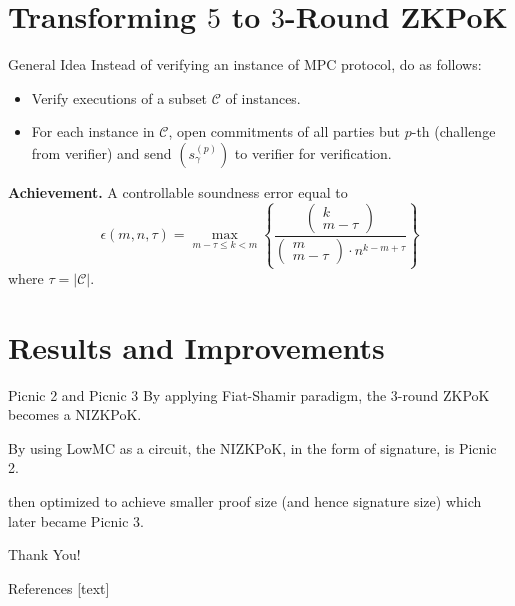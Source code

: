 \documentclass{beamer}
\begin{document}
	\section{Transforming $5$ to $3$-Round ZKPoK}
	\begin{frame}{General Idea}
		Instead of verifying an instance of MPC protocol, do as follows:\pause
		\begin{itemize}
			\item Verify executions of a subset $\mathcal{C}$ of instances.\pause
			\item For each instance in $\mathcal{C}$, open commitments of all parties but $p$-th (challenge from verifier) and send $(s_\gamma^{(p)})$ to verifier for verification.\pause
		\end{itemize}
		
		\textbf{Achievement.} A controllable soundness error equal to 
		\begin{equation*}
			\epsilon(m, n, \tau) = \max_{m - \tau \leq k < m}\left\{\frac{\begin{pmatrix}
					k\\m-\tau
			\end{pmatrix}}{\begin{pmatrix}
			m\\m-\tau
		\end{pmatrix}\cdot n^{k - m + \tau}}\right\}
		\end{equation*}
		where $\tau = \vert \mathcal{C}\vert$.
	\end{frame}

	\section{Results and Improvements}
	\begin{frame}{Picnic 2 and Picnic 3}
		By applying Fiat-Shamir paradigm, the $3$-round ZKPoK becomes a NIZKPoK.\pause
		
		By using LowMC as a circuit, the NIZKPoK, in the form of signature, is Picnic 2.\pause
		
		\cite{KalesZ20} then optimized to achieve smaller proof size (and hence signature size) which later became Picnic 3.
	\end{frame}
	
	\begin{frame}{}
		\begin{center}
			{\fontsize{20}{20}\selectfont Thank You!}
		\end{center}
	\end{frame}

	\begin{frame}[allowframebreaks]{References}
		
		
		
	\end{frame}
	
\end{document}
